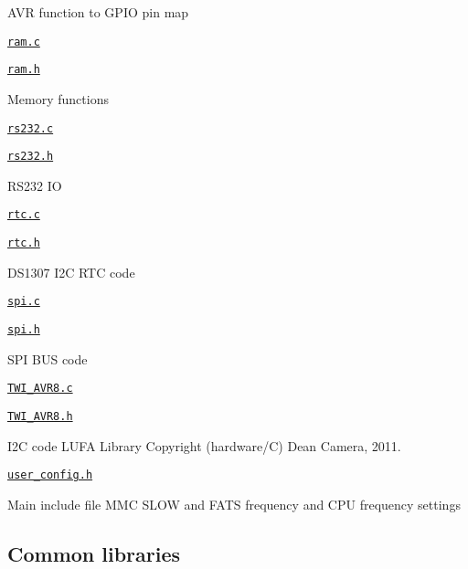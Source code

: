\begin{DoxyItemize}
\begin{DoxyItemize}
\begin{DoxyItemize}
\item A\+VR function to G\+P\+IO pin map
\end{DoxyItemize}
\item \href{hardware/ram.c}{\tt ram.\+c}
\item \href{hardware/ram.h}{\tt ram.\+h}
\begin{DoxyItemize}
\item Memory functions
\end{DoxyItemize}
\item \href{hardware/rs232.c}{\tt rs232.\+c}
\item \href{hardware/rs232.h}{\tt rs232.\+h}
\begin{DoxyItemize}
\item R\+S232 IO
\end{DoxyItemize}
\item \href{hardware/rtc.c}{\tt rtc.\+c}
\item \href{hardware/rtc.h}{\tt rtc.\+h}
\begin{DoxyItemize}
\item D\+S1307 I2C R\+TC code
\end{DoxyItemize}
\item \href{hardware/spi.c}{\tt spi.\+c}
\item \href{hardware/spi.h}{\tt spi.\+h}
\begin{DoxyItemize}
\item S\+PI B\+US code
\end{DoxyItemize}
\item \href{hardware/TWI_AVR8.c}{\tt T\+W\+I\+\_\+\+A\+V\+R8.\+c}
\item \href{hardware/TWI_AVR8.h}{\tt T\+W\+I\+\_\+\+A\+V\+R8.\+h}
\begin{DoxyItemize}
\item I2C code L\+U\+FA Library Copyright (hardware/C) Dean Camera, 2011.
\end{DoxyItemize}
\item \href{hardware/user_config.h}{\tt user\+\_\+config.\+h}
\begin{DoxyItemize}
\item Main include file M\+MC S\+L\+OW and F\+A\+TS frequency and C\+PU frequency settings
\end{DoxyItemize}
\end{DoxyItemize}
\end{DoxyItemize}

\subsection*{Common libraries}


